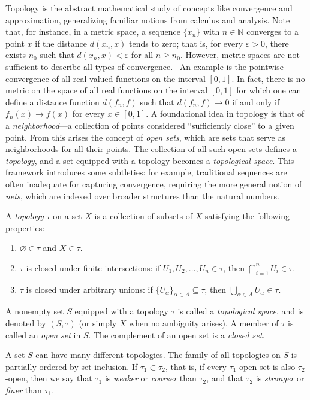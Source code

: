 Topology is the abstract mathematical study of concepts like convergence and approximation, generalizing familiar notions from calculus and analysis. 
Note that, for instance, in a metric space, a sequence $\{x_n\}$ with $n \in \mathbb{N}$ converges to a point $x$ if the distance $d(x_n, x)$ tends to zero; that is, for every $\varepsilon > 0$, there exists $n_0$ such that $d(x_n, x) < \varepsilon$ for all $n \geq n_0$. However, metric spaces are not sufficient to describe all types of convergence.  An example is the pointwise convergence of all real-valued functions on the interval $[0, 1]$. In fact, there is no metric on the space of all real functions on the interval $[0,1]$ for which one can define a distance function $d(f_n, f)$ such that $d(f_n, f) \to 0$ if and only if $f_n(x) \to f(x)$ for every $x \in [0, 1]$. 
A foundational idea in topology is that of a \emph{neighborhood}—a collection of points considered ``sufficiently close'' to a given point. From this arises the concept of \emph{open sets}, which are sets that serve as neighborhoods for all their points. The collection of all such open sets defines a \emph{topology}, and a set equipped with a topology becomes a \emph{topological space}. This framework introduces some subtleties: for example, traditional sequences are often inadequate for capturing convergence, requiring the more general notion of \emph{nets}, which are indexed over broader structures than the natural numbers.

\begin{definition}
  A \emph{topology} $\tau$ on a set $X$ is a collection of subsets of $X$ satisfying the following properties:
\begin{enumerate}
    \item $\varnothing \in \tau$ and $X \in \tau$.
    \item $\tau$ is closed under finite intersections: if $U_1, U_2, \dots, U_n \in \tau$, then $\bigcap_{i=1}^n U_i \in \tau$.
    \item $\tau$ is closed under arbitrary unions: if $\{U_\alpha\}_{\alpha \in A} \subseteq \tau$, then $\bigcup_{\alpha \in A} U_\alpha \in \tau$.
\end{enumerate}

A nonempty set $S$ equipped with a topology $\tau$ is called a \emph{topological space}, and is denoted by $(S, \tau)$ (or simply $X$ when no ambiguity arises). A member of $\tau$ is called an \emph{open set} in $S$. The complement of an open set is a \emph{closed set}. 

A set \( S \) can have many different topologies.  
The family of all topologies on \( S \) is partially ordered by set inclusion.  
If \( \tau_1 \subset \tau_2 \), that is, if every \( \tau_1 \)-open set is also \( \tau_2 \)-open,  
then we say that \( \tau_1 \) is \emph{weaker} or \emph{coarser} than \( \tau_2 \),  
and that \( \tau_2 \) is \emph{stronger} or \emph{finer} than \( \tau_1 \).
\end{definition}

